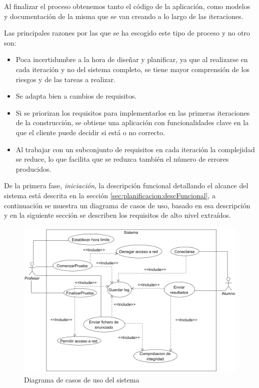 Al finalizar el proceso obtenemos tanto el código de la aplicación, como modelos y documentación de la misma que se van creando a lo largo de las iteraciones.
\newline


Las principales razones por las que se ha escogido este tipo de proceso y no otro son:

\begin{itemize}

	\item[\ding{70}] Poca incertidumbre a la hora de diseñar y planificar, ya que al realizarse en cada iteración y no del sistema completo, se tiene mayor comprensión de los riesgos y de las tareas a realizar.

	\item[\ding{70}] Se adapta bien a cambios de requisitos.

	\item[\ding{70}] Si se priorizan los requisitos para implementarlos en las primeras iteraciones de la construcción, se obtiene una aplicación con funcionalidades clave en la que el cliente puede decidir si está o no correcto.

	\item[\ding{70}] Al trabajar con un subconjunto de requisitos en cada iteración la complejidad se reduce, lo que facilita que se reduzca también el número de errores producidos.

\end{itemize}



De la primera fase, \emph{iniciación}, la descripción funcional detallando el alcance del sistema está descrita en la sección \ref{sec:planificacion:descFuncional}, a continuación se muestra un diagrama de casos de uso, basado en esa descripción y en la siguiente sección se describen los requisitos de alto nivel extraídos.

\begin{figure}[!h]
    \centering
    \includegraphics[width=\linewidth]{planificacion/casosUsoSistema2}%
    \caption{Diagrama de casos de uso del sistema}
    \label{fig:planificacion:casosUso}
\end{figure}



